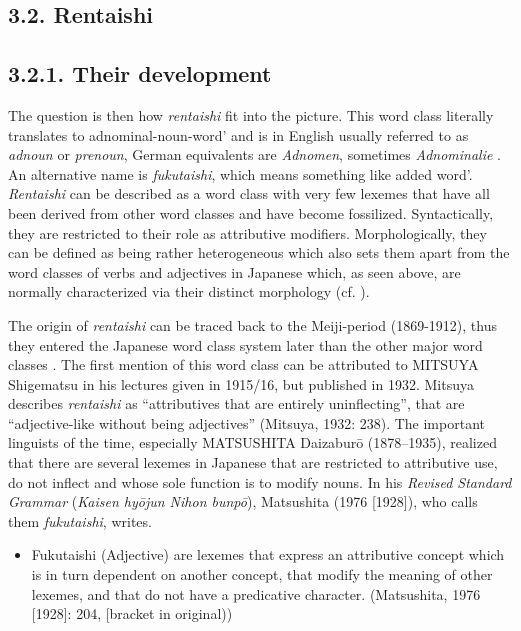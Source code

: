 \documentclass[output=paper]{langscibook}
\begin{document}
\subsection{3.2. Rentaishi}
\subsection{3.2.1. Their development}

The question is then how \textit{rentaishi} fit into the picture. This word class literally translates to {\textasciigrave}adnominal-noun-word’ and is in English usually referred to as \textit{adnoun} or \textit{prenoun}, German equivalents are \textit{Adnomen}, sometimes \textit{Adnominalie} \citep{Rickmeyer1995}. An alternative name is \textit{fukutaishi}, which means something like {\textasciigrave}added word’. \textit{Rentaishi} can be described as a word class with very few lexemes that have all been derived from other word classes and have become fossilized. Syntactically, they are restricted to their role as attributive modifiers. Morphologically, they can be defined as being rather heterogeneous which also sets them apart from the word classes of verbs and adjectives in Japanese which, as seen above, are normally characterized via their distinct morphology (cf. \citealt{NittaEtAl2000}).

The origin of \textit{rentaishi} can be traced back to the Meiji-period (1869-1912), thus they entered the Japanese word class system later than the other major word classes \citep{Frellesvig2010}. The first mention of this word class can be attributed to MITSUYA Shigematsu in his lectures given in 1915/16, but published in 1932. Mitsuya describes \textit{rentaishi} as “attributives that are entirely uninflecting”, that are “adjective-like without being adjectives” (Mitsuya, 1932: 238). The important linguists of the time, especially MATSUSHITA Daizaburō (1878–1935), realized that there are several lexemes in Japanese that are restricted to attributive use, do not inflect and whose sole function is to modify nouns. In his \textit{Revised Standard Grammar} (\textit{Kaisen hyōjun Nihon bunpō}), Matsushita (1976 [1928]), who calls them \textit{fukutaishi}, writes.

\begin{itemize}
\item \begin{styleBeispielCinqueKapitel}
Fukutaishi (Adjective) are lexemes that express an attributive concept which is in turn dependent on another concept, that modify the meaning of other lexemes, and that do not have a predicative character. (Matsushita, 1976 [1928]: 204, [bracket in original))
\end{styleBeispielCinqueKapitel}
\end{itemize}
\end{document}
